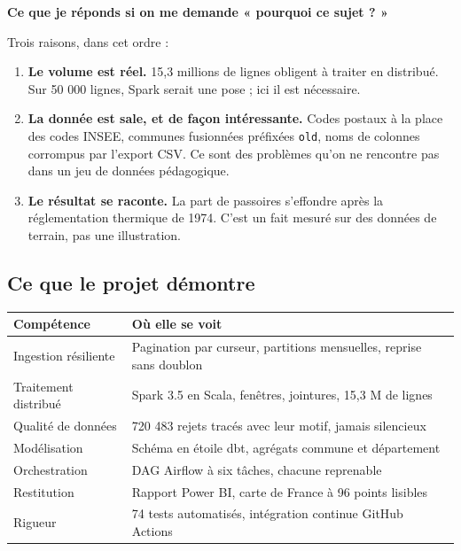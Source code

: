 \documentclass[11pt,a4paper]{article}
\newcommand{\cmd}[1]{\texttt{\small #1}}
\newcommand{\titrebloc}[1]{\textbf{\color{encre}#1}\par\vspace{0.25em}}
\begin{document}
\begin{pourquoi}
\titrebloc{Ce que je réponds si on me demande « pourquoi ce sujet ? »}
Trois raisons, dans cet ordre :

\begin{enumerate}
  \item \textbf{Le volume est réel.} 15,3 millions de lignes obligent à traiter
        en distribué. Sur 50 000 lignes, Spark serait une pose ; ici il est
        nécessaire.
  \item \textbf{La donnée est sale, et de façon intéressante.} Codes postaux
        à la place des codes INSEE, communes fusionnées préfixées
        \cmd{old}, noms de colonnes corrompus par l'export CSV. Ce sont des
        problèmes qu'on ne rencontre pas dans un jeu de données pédagogique.
  \item \textbf{Le résultat se raconte.} La part de passoires s'effondre après
        la réglementation thermique de 1974. C'est un fait mesuré sur des
        données de terrain, pas une illustration.
\end{enumerate}
\end{pourquoi}

\subsection{Ce que le projet démontre}

\begin{center}
\begin{tabularx}{\textwidth}{@{}lX@{}}
\toprule
\textbf{Compétence} & \textbf{Où elle se voit} \\
\midrule
Ingestion résiliente & Pagination par curseur, partitions mensuelles, reprise sans doublon \\
Traitement distribué & Spark 3.5 en Scala, fenêtres, jointures, 15,3 M de lignes \\
Qualité de données & 720 483 rejets tracés avec leur motif, jamais silencieux \\
Modélisation & Schéma en étoile dbt, agrégats commune et département \\
Orchestration & DAG Airflow à six tâches, chacune reprenable \\
Restitution & Rapport Power BI, carte de France à 96 points lisibles \\
Rigueur & 74 tests automatisés, intégration continue GitHub Actions \\
\bottomrule
\end{tabularx}
\end{center}
\end{document}
